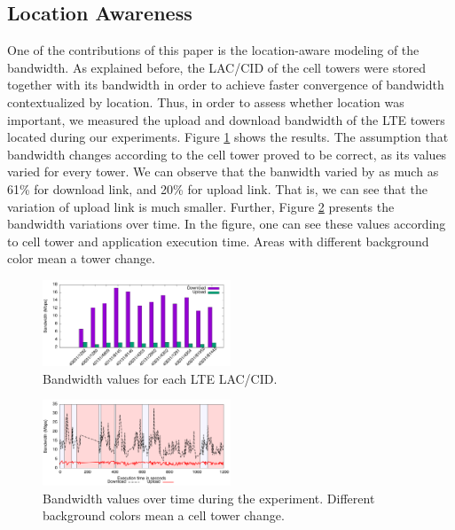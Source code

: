\documentclass[10pt, conference, letterpaper]{IEEEtran}
\begin{document}
\subsection{Location Awareness}

One of the contributions of this paper is the location-aware modeling of the bandwidth. As explained before, the LAC/CID of the cell towers were stored together with its bandwidth in order to achieve faster convergence of bandwidth contextualized by location. Thus, in order to assess whether location was important, we measured the upload and download bandwidth of the LTE towers located during our experiments.  Figure \ref{fig:bwtime} shows the results. The assumption that bandwidth changes according to the cell tower proved to be correct, as its values varied for every tower. We can observe that the banwidth varied by as much as 61\% for download link, and 20\% for upload link. That is, we can see that the variation of upload link is much smaller. Further, Figure \ref{fig:bwtowers} presents the bandwidth variations over time. In  the figure, one can see these values according to cell tower and application execution time. Areas with different background color mean a tower change. 

\begin{figure}[b]
  \centering
  \includegraphics[width=0.5\textwidth]{results/plots/laccid-bw/bars.png}
  \caption{Bandwidth values for each LTE LAC/CID.}
  \label{fig:bwtime}
\end{figure}

\begin{figure}[b]
  \centering
  \includegraphics[width=0.5\textwidth]{results/plots/bw-fluctuation/executions.png}
  \caption{Bandwidth values over time during the experiment. Different background colors mean a cell tower change.}
  \label{fig:bwtowers}
\end{figure}
\end{document}
